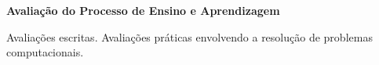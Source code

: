 \begin{snugshade}\begin{center}\textbf{
    Avaliação do Processo de Ensino e Aprendizagem
}\end{center}\end{snugshade}

\noindent
Avaliações escritas. Avaliações práticas envolvendo a resolução de problemas computacionais.
